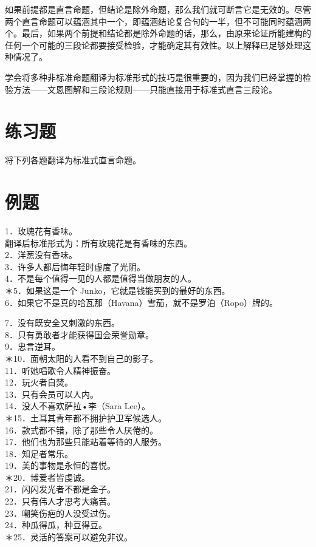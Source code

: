 如果前提都是直言命题，但结论是除外命题，那么我们就可断言它是无效的。尽管两个直言命题可以蕴涵其中一个，即蕴涵结论复合句的一半，但不可能同时蕴涵两个。最后，如果两个前提和结论都是除外命题的话，那么，由原来论证所能建构的任何一个可能的三段论都要接受检验，才能确定其有效性。以上解释已足够处理这种情况了。

学会将多种非标准命题翻译为标准形式的技巧是很重要的，因为我们已经掌握的检验方法——文恩图解和三段论规则——只能直接用于标准式直言三段论。

\section*{练习题}
将下列各题翻译为标准式直言命题。

\section*{例题}
1．玫瑰花有香味。\\
翻译后标准形式为：所有玫瑰花是有香味的东西。\\
2．洋葱没有香味。\\
3．许多人都后悔年轻时虚度了光阴。\\
4．不是每个值得一见的人都是值得当做朋友的人。\\
＊5．如果这是一个 Junko，它就是钱能买到的最好的东西。\\
6．如果它不是真的哈瓦那（Havana）雪茄，就不是罗泊（Ropo）牌的。

7．没有既安全又刺激的东西。\\
8．只有勇敢者才能获得国会荣誉勋章。\\
9．忠言逆耳。\\
＊10．面朝太阳的人看不到自己的影子。\\
11．听她唱歌令人精神振奋。\\
12．玩火者自焚。\\
13．只有会员可以人内。\\
14．没人不喜欢萨拉•李（Sara Lee）。\\
＊15．土耳其青年都不拥护护卫军候选人。\\
16．款式都不错，除了那些令人厌倦的。\\
17．他们也为那些只能站着等待的人服务。\\
18．知足者常乐。\\
19．美的事物是永恒的喜悦。\\
＊20．博爱者皆虔诚。\\
21．闪闪发光者不都是金子。\\
22．只有伟人才思考大痛苦。\\
23．嘲笑伤疤的人没受过伤。\\
24．种瓜得瓜，种豆得豆。\\
＊25．灵活的答案可以避免非议。

